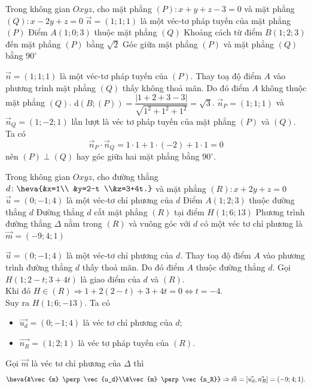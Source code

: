 \begin{ex}%
	Trong không gian $Oxyz$, cho mặt phẳng $(P)\colon x+y+z-3=0$ và mặt phẳng $(Q) \colon x-2y+z=0$
	\choiceTF
	{\True $\vec{n}=(1;1;1)$ là một véc-tơ pháp tuyến của mặt phẳng $(P)$}
	{Điểm $A(1;0;3)$ thuộc mặt phẳng $(Q)$}
	{Khoảng cách từ điểm $B(1;2;3)$ đến mặt phẳng $(P)$ bằng $\sqrt{2}$}
	{\True Góc giữa mặt phẳng $(P)$ và mặt phẳng $(Q)$ bằng $90^\circ$}
	\loigiai
	{
		\begin{itemchoice}
			\itemch $\vec{n}=(1;1;1)$ là một véc-tơ pháp tuyến của $(P)$.
			\itemch Thay toạ độ điểm $A$ vào phương trình mặt phẳng $(Q)$ thấy không thoả mãn. Do đó  điểm $A$ không thuộc mặt phẳng $(Q)$.
			\itemch $\mathrm{d}(B;(P))=\dfrac{\left|1+2+3-3 \right|}{\sqrt{1^2+1^2+1^2}}=\sqrt{3}$.
			\itemch $\vec{n}_P=(1;1;1)$ và $\vec{n}_Q=(1;-2;1)$ lần lượt là véc tơ pháp tuyến của mặt phẳng $(P)$ và $(Q)$. Ta có 
			\[\vec{n}_P \cdot \vec{n}_Q = 1\cdot1+1\cdot(-2)+1\cdot 1=0\] 
			nên $(P) \perp (Q)$ hay góc giữa hai mặt phẳng bằng $90^\circ$.
		\end{itemchoice}
	}
\end{ex}
\begin{ex}%
	Trong không gian $Oxyz$, cho đường thẳng $d\colon \heva{&x=1\\ &y=2-t \\&z=3+4t.}$ và mặt phẳng $(R) \colon x+2y+z=0$
	\choiceTF
	{\True $\vec{u}=(0;-1;4)$ là một véc-tơ chỉ phương của $d$}
	{\True Điểm $A(1;2;3)$ thuộc đường thẳng $d$}
	{Đường thẳng $d$ cắt mặt phẳng $(R)$ tại điểm $H(1;6;13)$}
	{\True Phương trình đường thẳng $\Delta$ nằm trong $(R)$ và vuông góc với $d$ có một véc tơ chỉ phương là $\vec{m}=(-9;4;1)$}
	\loigiai
	{
		\begin{itemchoice}
			\itemch $\vec{u}=(0;-1;4)$ là một véc-tơ chỉ phương của $d$.
			\itemch Thay toạ độ điểm $A$ vào phương trình đường thẳng $d$ thấy thoả mãn. Do đó điểm $A$ thuộc đường thẳng $d$.
			\itemch Gọi $H(1;2-t;3+4t)$ là giao điểm của $d$ và $(R)$.\\
			Khi đó $H \in (R) \Rightarrow 1+2(2-t)+3+4t=0 \Leftrightarrow t=-4$.\\
			Suy ra $H(1;6;-13)$.
			\itemch Ta có 
			\begin{itemize}
				\item [$\bullet$] $\vec{u_d}=(0;-1;4)$ là véc tơ chỉ phương của $d$;
				\item [$\bullet$] $\vec{n_R}=(1;2;1)$ là véc tơ pháp tuyến của $(R)$.
			\end{itemize}
			Gọi $\vec{m}$ là véc tơ chỉ phương của $\Delta$ thì
			\[\heva{&\vec{m} \perp \vec{u_d}\\&\vec{m} \perp \vec{n_R}} \Rightarrow \vec{m}=\left[\vec{u_d},\vec{n_R}\right]=(-9;4;1). \]
		\end{itemchoice}
	}
\end{ex}

